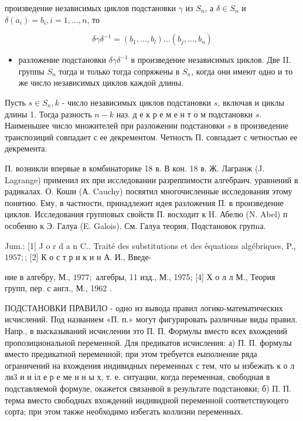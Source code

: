 \documentclass[10pt]{article}
\begin{document}
произведение независимых циклов подстановки $\gamma$ из $S_{n}$, а $\delta \in S_{n}$ и $\delta\left(a_{i}\right)=b_{i}, i=1, \ldots, n$, то



\[

\delta \gamma \delta^{-1}=\left(b_{1}, \ldots, b_{l}\right) \ldots\left(b_{j}, \ldots, b_{n}\right)

\]



\begin{itemize}

  \item разложение подстановки $\delta \gamma \delta^{-1}$ в произведение независимых циклов. Две II. группы $S_{n}$ тогда и только тогда сопряжены в $S_{n}$, когда они имеют одно и то же число независимых циклов каждой длины.

\end{itemize}



Пусть $s \in S_{n}, k$ - число независимых циклов подстановки $s$, включая и циклы длины 1. Тогда разность $n-k$ наз. д е к р е м е н т о м подстановки $s$. Наименьшее число множителей при разложении подстановки $s$ в произведение транспозиций совпадает с ее декрементом. Четность П. совпадает с четностью ее декремента.



П. возникли впервые в комбинаторике 18 в. В кон. 18 в. Ж. Лагранж (J. Lagrange) применил их при исследовании разреппимости алгебраич. уравнений в радикалах. О. Коши (А. Cauchy) посвятил многочисленные исследования этому понятию. Ему, в частности, принадлежит идея разложения П. в произведение циклов. Исследования групповых свойств П. восходит к H. Абелю (N. Abel) п особенно к Э. Галуа (E. Galois). См. Галуа теория, Подстановок групnа.



Jum.: [1] J o r d a n C.. Traité des substitutions et des équations algébriques, P., $1957 ;$; [2] К о с т р и к и н А. И., Введе-

ние в алгебру, М., $1977 ;$ алгебры, 11 изд., М., 1975; [4] Х о л л М., Теория групп, пер. с англ., М., 1962 .



ПОДСТАНОВКИ ПРАВИЛО - одно из вывода правил логико-математических исчислений. Под названием «П. п.» могут фигурировать различные виды правил. Напр., в высказываний исчислении это П. П. Формулы вместо всех вхождений пропозициональной переменной. Для предикатов исчисления: а) П. П. формулы вместо предикатной переменной; при этом требуется еыполнение ряда ограничений на вхождения индивидных переменных с тем, что ы избежать к о л ли3 и и іл е р е ме н н ы х, т. е. ситуации, когда переменная, свободная в подставляемой формуле, окажется связанвой в результате подстановки; б) П. П. терма вместо свободных вхождений индивидной переменной соответствуюцего сорта; при этом также необходимо избегать коллизии переменных.
\end{document}
